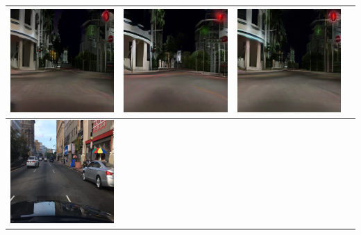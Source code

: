 \documentclass{VUMIFPSkursinis}
\begin{document}
\begin{table}[H]
{\begin{tabular}{|c|c|c|c|}
                \includegraphics[scale=0.35]{img/pvz/5_cycle} & \includegraphics[scale=0.35]{img/pvz/5_cut} & \includegraphics[scale=0.35]{img/pvz/5_mspc}
                \\
                \hline
                \includegraphics[scale=0.35]{img/pvz/6_real} & 

\end{tabular}}
\end{table}
\end{document}
